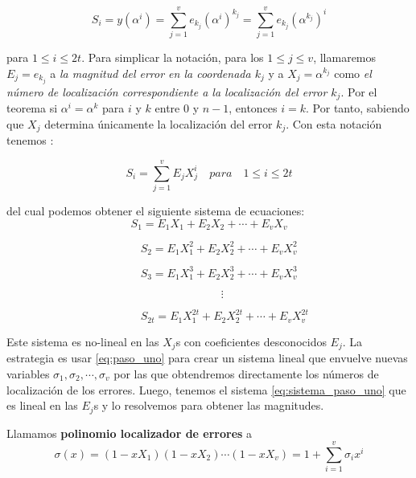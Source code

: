 \[ 
S_i = y(\alpha^i) = \sum_{j=1}^v e_{k_j}(\alpha^i)^{k_j} = \sum_{j=1}^v e_{k_j}(\alpha^{k_j})^i
\]

para $1 \leq i \leq 2t$. Para simplicar la notación, para los $1 \leq j \leq v$, llamaremos $E_j = e_{k_j}$ a \textit{la magnitud del error en la coordenada $k_j$} y a $X_j = \alpha^{k_j}$ como \textit{el número de localización correspondiente a la localización del error $k_j$}. Por el teorema  %
si $\alpha^i = \alpha^k$ para $i$ y $k$ entre $0$ y $n-1$, entonces $i = k$. Por tanto, sabiendo que $X_j$ determina únicamente la localización del error $k_j$. Con esta notación tenemos :

\begin{equation}
\label{eq:paso_uno}
S_i =  \sum_{j=1}^v E_jX_j^i \quad para \quad 1 \leq i \leq 2t
\end{equation} 



del cual podemos obtener el siguiente sistema de ecuaciones:
\begin{equation}
\label{eq:sistema_paso_uno} S_1 = E_1X_1 + E_2X_2 + \cdots + E_vX_v 
 \end{equation}
 
  $\hspace{5cm} S_2 = E_1X_1^2 + E_2X_2^2 + \cdots + E_vX_v^2$ 
 
  $\hspace{5cm} S_3 = E_1X_1^3 + E_2X_2^3 + \cdots + E_vX_v^3 $
  
   $\hspace{8cm} \vdots $
     
  $\hspace{5cm} S_{2t} = E_1X_1^{2t} + E_2X_2^{2t} + \cdots + E_vX_v^{2t}$




Este sistema es no-lineal en las $X_j$s con coeficientes desconocidos $E_j$. La estrategia es usar \ref{eq:paso_uno} para crear un sistema lineal que envuelve nuevas variables $\sigma_1,\sigma_2, \cdots, \sigma_v$ por las que obtendremos directamente los números de localización de los errores. Luego, tenemos el sistema \ref{eq:sistema_paso_uno} que es lineal en las $E_j$s y lo resolvemos para obtener las magnitudes.

\begin{definition}
Llamamos \textbf{polinomio localizador de errores} a 
\[ 
\sigma(x) = (1-xX_1)(1-xX_2)\cdots(1-xX_v) = 1 + \sum_{i=1}^v \sigma_ix^i
\]
\end{definition}

